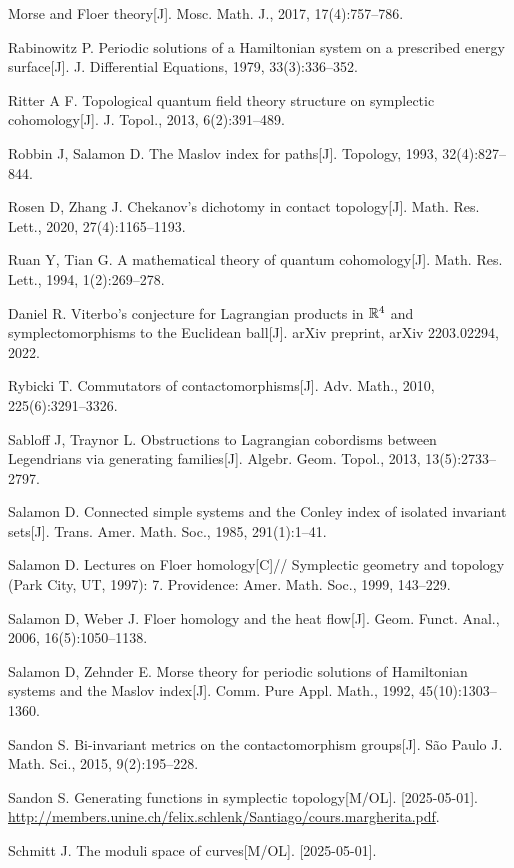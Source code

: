 \begin{enumerate}[label={[\arabic*]},leftmargin=3.2em,itemsep=2pt,parsep=0pt]
        Morse and Floer theory[J]. Mosc. Math. J., 2017, 17(4):757--786.
  \item Rabinowitz P. Periodic solutions of a Hamiltonian system on a prescribed energy
        surface[J]. J. Differential Equations, 1979, 33(3):336--352.
  \item Ritter A F. Topological quantum field theory structure on symplectic cohomology[J].
        J. Topol., 2013, 6(2):391--489.
  \item Robbin J, Salamon D. The Maslov index for paths[J]. Topology, 1993, 32(4):827--844.
  \item Rosen D, Zhang J. Chekanov's dichotomy in contact topology[J]. Math. Res. Lett.,
        2020, 27(4):1165--1193.
  \item Ruan Y, Tian G. A mathematical theory of quantum cohomology[J]. Math. Res. Lett.,
        1994, 1(2):269--278.
  \item Daniel R. Viterbo's conjecture for Lagrangian products in $\mathbb{R}^4$ and
        symplectomorphisms to the Euclidean ball[J]. arXiv preprint, arXiv 2203.02294, 2022.
  \item Rybicki T. Commutators of contactomorphisms[J]. Adv. Math., 2010, 225(6):3291--3326.
  \item Sabloff J, Traynor L. Obstructions to Lagrangian cobordisms between Legendrians via
        generating families[J]. Algebr. Geom. Topol., 2013, 13(5):2733--2797.
  \item Salamon D. Connected simple systems and the Conley index of isolated invariant
        sets[J]. Trans. Amer. Math. Soc., 1985, 291(1):1--41.
  \item Salamon D. Lectures on Floer homology[C]// Symplectic geometry and topology (Park
        City, UT, 1997): 7. Providence: Amer. Math. Soc., 1999, 143--229.
  \item Salamon D, Weber J. Floer homology and the heat flow[J]. Geom. Funct. Anal., 2006,
        16(5):1050--1138.
  \item Salamon D, Zehnder E. Morse theory for periodic solutions of Hamiltonian systems and
        the Maslov index[J]. Comm. Pure Appl. Math., 1992, 45(10):1303--1360.
  \item Sandon S. Bi-invariant metrics on the contactomorphism groups[J]. São Paulo
        J. Math. Sci., 2015, 9(2):195--228.
  \item Sandon S. Generating functions in symplectic topology[M/OL]. [2025-05-01].
        \url{http://members.unine.ch/felix.schlenk/Santiago/cours.margherita.pdf}.
  \item Schmitt J. The moduli space of curves[M/OL]. [2025-05-01].

\end{enumerate}
